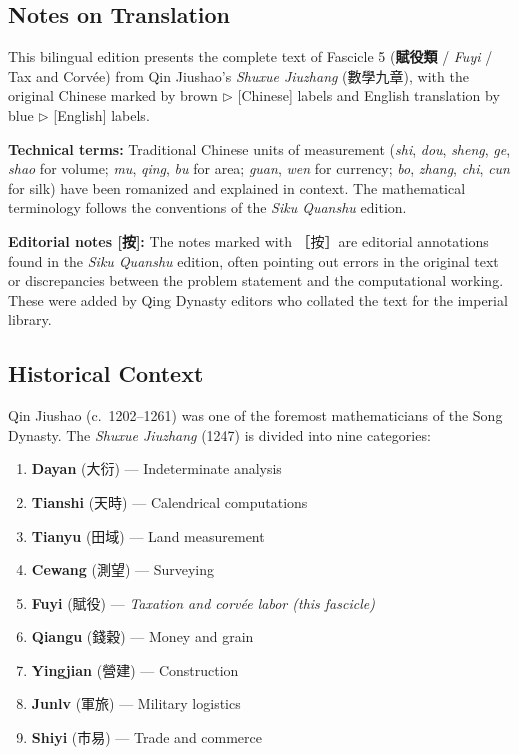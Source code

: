 \documentclass[10pt,a4paper]{article}
\begin{document}
\subsection*{Notes on Translation}

This bilingual edition presents the complete text of Fascicle 5 (\textbf{賦役類} / \textit{Fuyi} / Tax and Corv\'{e}e) from Qin Jiushao's \textit{Shuxue Jiuzhang} (數學九章), with the original Chinese marked by brown $\triangleright$ [Chinese] labels and English translation by blue $\triangleright$ [English] labels.

\textbf{Technical terms:} Traditional Chinese units of measurement (\textit{shi}, \textit{dou}, \textit{sheng}, \textit{ge}, \textit{shao} for volume; \textit{mu}, \textit{qing}, \textit{bu} for area; \textit{guan}, \textit{wen} for currency; \textit{bo}, \textit{zhang}, \textit{chi}, \textit{cun} for silk) have been romanized and explained in context. The mathematical terminology follows the conventions of the \textit{Siku Quanshu} edition.

\textbf{Editorial notes [按]:} The notes marked with ［按］are editorial annotations found in the \textit{Siku Quanshu} edition, often pointing out errors in the original text or discrepancies between the problem statement and the computational working. These were added by Qing Dynasty editors who collated the text for the imperial library.

\subsection*{Historical Context}

Qin Jiushao (c.\ 1202--1261) was one of the foremost mathematicians of the Song Dynasty. The \textit{Shuxue Jiuzhang} (1247) is divided into nine categories:

\begin{enumerate}
    \item \textbf{Dayan} (大衍) --- Indeterminate analysis
    \item \textbf{Tianshi} (天時) --- Calendrical computations
    \item \textbf{Tianyu} (田域) --- Land measurement
    \item \textbf{Cewang} (測望) --- Surveying
    \item \textbf{Fuyi} (賦役) --- \textit{Taxation and corv\'{e}e labor (this fascicle)}
    \item \textbf{Qiangu} (錢穀) --- Money and grain
    \item \textbf{Yingjian} (營建) --- Construction
    \item \textbf{Junlv} (軍旅) --- Military logistics
    \item \textbf{Shiyi} (市易) --- Trade and commerce
\end{enumerate}
\end{document}
